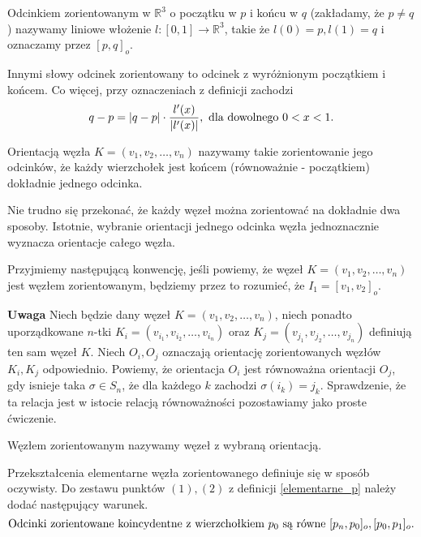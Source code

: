 \begin{definicja}
 Odcinkiem zorientowanym w $\mathbb{R}^3$ o początku w $p$ i końcu w $q$ (zakładamy, że $p\neq q$) nazywamy liniowe włożenie $l\colon[0,1]\to\mathbb{R}^3$, takie że $l(0) = p, l(1) = q$ i oznaczamy przez
 $[p,q]_o$.
\end{definicja}
 
Innymi słowy odcinek zorientowany to odcinek z wyróżnionym początkiem i końcem. Co więcej, przy oznaczeniach z definicji zachodzi
\begin{displaymath}
 q-p =  |q-p|\cdot\frac{l'(x)}{|l'(x)|}, \hbox{ dla dowolnego } 0 < x < 1.
\end{displaymath}
 
\begin{definicja}
 Orientacją węzła $K = (v_1, v_2, \ldots, v_n)$ nazywamy takie zorientowanie jego odcinków, że każdy wierzchołek jest końcem (równoważnie - początkiem) dokładnie jednego odcinka.
\end{definicja}
 
Nie trudno się przekonać, że każdy węzeł można zorientować na dokładnie dwa sposoby. Istotnie, wybranie orientacji jednego odcinka węzła jednoznacznie wyznacza orientacje całego
węzła.
 
Przyjmiemy następującą konwencję, jeśli powiemy, że węzeł $K = (v_1, v_2, \ldots, v_n)$ jest węzłem zorientowanym, będziemy przez to rozumieć, że $I_1 = [v_1, v_2]_o$.
 
\textbf{Uwaga} Niech będzie dany węzeł $K = (v_1, v_2, \ldots, v_n)$, niech ponadto uporządkowane $n$-tki $K_i = (v_{i_1}, v_{i_2}, \ldots, v_{i_n})$
oraz $K_j = (v_{j_1}, v_{j_2}, \ldots, v_{j_n})$ definiują ten sam węzeł $K$. Niech $O_i, O_j$ oznaczają orientację zorientowanych węzłów $K_i, K_j$ odpowiednio. Powiemy, że orientacja
$O_i$ jest równoważna orientacji $O_j$, gdy isnieje taka $\sigma\in S_n$, że dla każdego $k$ zachodzi $\sigma(i_k) = j_k$. Sprawdzenie, że ta relacja jest w istocie relacją równoważności
pozostawiamy jako proste ćwiczenie.
 
\begin{definicja}
 Węzłem zorientowanym nazywamy węzeł z wybraną orientacją.
\end{definicja}
 
Przekształcenia elementarne węzła zorientowanego definiuje się w sposób oczywisty. Do zestawu punktów $(1), (2)$ z definicji \ref{elementarne_p} należy dodać następujący warunek.
\begin{displaymath}
 \hbox{Odcinki zorientowane koincydentne z wierzchołkiem } p_0 \hbox{ są równe }[p_n, p_0]_o, [p_0, p_1]_o.
\end{displaymath}
 
